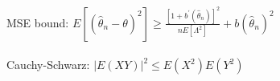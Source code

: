 MSE bound: $E[(\hat \theta_n -\theta )^{2}] \geq \frac{[1 + b^{\prime} (\hat\theta_n)]^{2}}{n E[\Lambda ^{2}]} + {b(\hat\theta_n)}^{2}$ \\
 \\
Cauchy-Schwarz: $|E(XY)|^2 \leq E(X^2) E(Y^2)$ 







